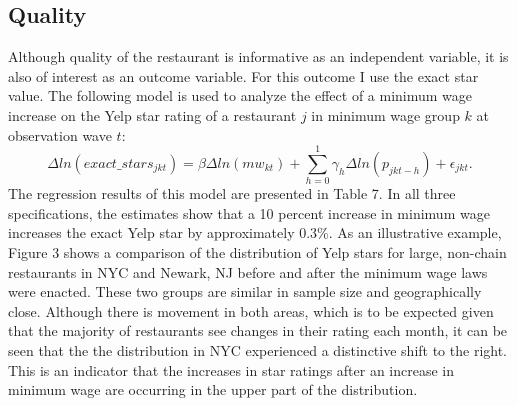 \documentclass[11pt]{article}
\begin{document}
\subsection{Quality}
Although quality of the restaurant is informative as an independent variable, it is also of interest as an outcome variable. For this outcome I use the exact star value. The following model is used to analyze the effect of a minimum wage increase on the Yelp star rating of a restaurant $j$ in minimum wage group $k$ at observation wave $t$:
\begin{equation}
\Delta ln(exact\_stars_{jkt}) = \beta \Delta ln(mw_{kt}) +\sum_{h=0}^{1}  \gamma_h \Delta ln(p_{jkt-h}) + \epsilon_{jkt}.
\end{equation} 
The regression results of this model are presented in Table 7.  In all three specifications, the estimates show that a 10 percent increase in minimum wage increases the exact Yelp star by approximately 0.3\%. As an illustrative example, Figure 3 shows a comparison of the distribution of Yelp stars for large, non-chain restaurants in NYC and Newark, NJ before and after the minimum wage laws were enacted. These two groups are similar in sample size and geographically close. Although there is movement in both areas, which is to be expected given that the majority of restaurants see changes in their rating each month, it can be seen that the the distribution in NYC experienced a distinctive shift to the right. This is an indicator that the increases in star ratings after an increase in minimum wage are occurring in the upper part of the distribution. 
\end{document}
